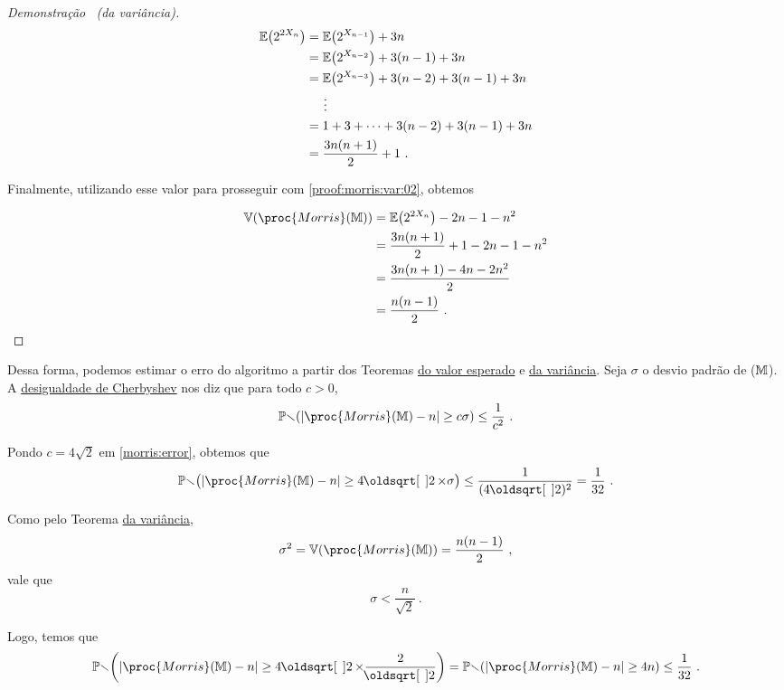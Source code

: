 \begin{proof}[Demonstração \ (da variância)]
  \begin{align*}
    \mathbb{E}\big(2^{2X_n}\big)
    &= \mathbb{E}\big(2^{X_{n-1}}\big) + 3n \\
    &=  \mathbb{E}\big(2^{X_{n-2}}\big) + 3(n - 1) + 3n \\
    &=  \mathbb{E}\big(2^{X_{n-3}}\big) + 3(n - 2) + 3(n - 1) + 3n \\
    &\hspace{5mm} \vdots\\
    &=1 + 3 + \dots + 3(n-2) + 3(n-1) + 3n \\
    &=\frac{3n(n+1)}{2} + 1 \ .
  \end{align*}

  Finalmente, utilizando esse valor para prosseguir com \eqref{proof:morris:var:02}, obtemos

  \begin{align*}
    \Vbb(\proc{Morris}(\Mbb))
    &= \Ebb\big(2^{2X_n}\big) - 2n - 1 - n^2 \\
    &= \frac{3n(n+1)}{2} + 1 - 2n -1 -n^2 \\
    &= \frac{3n(n+1) - 4n - 2n^2}{2} \\
    &= \frac{n(n-1)}{2} \ .
  \end{align*}

\end{proof}

Dessa forma, podemos estimar o erro do algoritmo  a partir dos Teoremas 
\hyperref[morris:theorem:expected_value]{do valor esperado} e \hyperref[morris:theorem:variance]{da variância}. Seja
$\sigma$ o desvio padrão de ($\mathbb{M}$). A \hyperref[ap:chebyshev]{desigualdade de Cherbyshev} nos diz que 
para todo $c > 0$, 
\begin{align}
  \Pbb(|\proc{Morris}(\Mbb) - n| \geq c\sigma) \leq \frac{1}{c^2} \ .  \label{morris:error}
\end{align}

Pondo $c = 4\sqrt{2}$ em \eqref{morris:error}, obtemos que 
\begin{align}
  \Pbb\big(|\proc{Morris}(\Mbb) - n| \geq 4\sqrt{2} \times \sigma\big) \leq \frac{1}{(4\sqrt{2})^2} = \frac{1}{32} \ .
\end{align}

Como pelo Teorema \hyperref[morris:theorem:variance]{da variância},
\[ \sigma^2 = \Vbb(\proc{Morris}(\Mbb)) = \frac{n(n-1)}{2} \ , \] vale que
\[ \sigma < \frac{n}{\sqrt{2}} \ . \]

Logo, temos que
\[  \Pbb\bigg(|\proc{Morris}(\Mbb) - n| \geq 4\sqrt{2} \times \frac{2}{\sqrt{2}}\bigg) =  
    \Pbb(|\proc{Morris}(\Mbb) - n| \geq 4n) \leq \frac{1}{32} \ . \]
    
